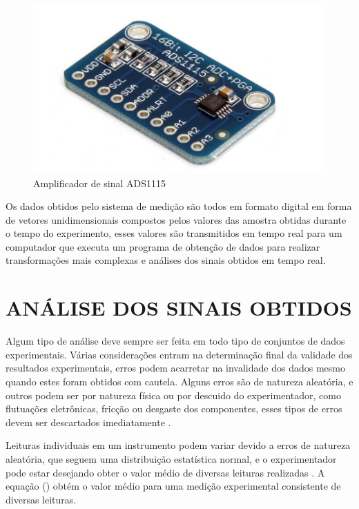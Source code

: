 \begin{figure}[htb]
	\caption{\label{fig:1150} Amplificador de sinal ADS1115}
	\begin{center}
		\includegraphics[width=\textwidth]{pictures/1150.png}
	\end{center}
\end{figure}

Os dados obtidos pelo sistema de medição são todos em formato digital em forma de vetores unidimensionais compostos pelos valores das amostra obtidas durante o  tempo do experimento, esses valores são transmitidos em tempo real para um computador que executa um programa de obtenção de dados para realizar transformações mais complexas e análises dos sinais obtidos em tempo real.

\section{ANÁLISE DOS SINAIS OBTIDOS}

Algum tipo de análise deve sempre ser feita em todo tipo de conjuntos de dados experimentais. Várias considerações entram na determinação final da validade dos resultados experimentais, erros podem acarretar na invalidade dos dados mesmo quando estes foram obtidos com cautela. Alguns erros são de natureza aleatória, e outros podem ser por natureza física ou por descuido do experimentador, como flutuações eletrônicas, fricção ou desgaste dos componentes, esses tipos de erros devem ser descartados imediatamente \autocite{Hollman2011}.

Leituras individuais em um instrumento podem variar devido a erros de natureza aleatória, que seguem uma distribuição estatística normal, e o experimentador pode estar desejando obter o valor médio de diversas leituras realizadas \autocite{Hollman2011}. A equação () obtém o valor médio para uma medição experimental consistente de diversas leituras.

